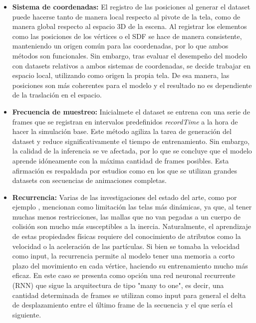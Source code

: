 \begin{itemize}
    \item \textbf{Sistema de coordenadas:} El registro de las posiciones al generar el dataset puede hacerse tanto de manera local respecto al pivote de la tela, como de manera global respecto al espacio 3D de la escena. Al registrar los elementos como las posiciones de los vértices o el SDF se hace de manera consistente, manteniendo un origen común para las coordenadas, por lo que ambos métodos son funcionales. Sin embargo, tras evaluar el desempeño del modelo con datasets relativos a ambos sistemas de coordenadas, se decide trabajar en espacio local, utilizando como origen la propia tela. De esa manera, las posiciones son más coherentes para el modelo y el resultado no es dependiente de la traslación en el espacio.

    \item \textbf{Frecuencia de muestreo:} Inicialmete el dataset se entrena con una serie de frames que se registran en intervalos predefinidos \textit{recordTime} a la hora de hacer la simulación base. Este método agiliza la tarea de generación del dataset y reduce significativamente el tiempo de entrenamiento. Sin embargo, la calidad de la inferencia se ve afectada, por lo que se concluye que el modelo aprende idóneamente con la máxima cantidad de frames posibles. Esta afirmación es respaldada por estudios como \cite{santesteban2022snug} en los que se utilizan grandes datasets con secuencias de animaciones completas.
    
    \item \textbf{Recurrencia:} Varias de las investigaciones del estado del arte, como por ejemplo \cite{santesteban2022snug}, mencionan como limitación las telas más dinámicas, ya que, al tener muchas menos restricciones, las mallas que no van pegadas a un cuerpo de colisión son mucho más susceptibles a la inercia. Naturalmente, el aprendizaje de estas propiedades físicas requiere del conocimiento de atributos como la velocidad o la aceleración de las partículas. Si bien se tomaba la velocidad como input, la recurrencia permite al modelo tener una memoria a corto plazo del movimiento en cada vértice, haciendo su entrenamiento mucho más eficaz. En este caso se presenta como opción una red neuronal recurrente (RNN) que sigue la arquitectura de tipo "many to one", es decir, una cantidad determinada de frames se utilizan como input para general el delta de desplazamiento entre el último frame de la secuencia y el que sería el siguiente.   %
\end{itemize}
    
